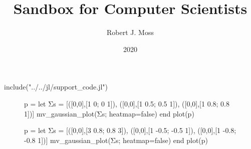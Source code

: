 \documentclass[fullbook]{tufte_algorithms_book}
\title{Sandbox for Computer Scientists}
\author[Moss]{Robert J. Moss}
\date{2020}
\begin{document}
\begin{jlcode}
	include("../../jl/support_code.jl")
\end{jlcode}

% 

\begin{figure}
    \begin{jlcode}
    p = let
        Σs = [([0,0],[1 0; 0 1]),
              ([0,0],[1 0.5; 0.5 1]),
              ([0,0],[1 0.8; 0.8 1])]
        mv_gaussian_plot(Σs; heatmap=false)
    end
    plot(p)
    \end{jlcode}
    \begin{center}
    \end{center}
\end{figure}

\begin{figure}
    \begin{jlcode}
    p = let
        Σs = [([0,0],[3 0.8; 0.8 3]),
              ([0,0],[1 -0.5; -0.5 1]),
              ([0,0],[1 -0.8; -0.8 1])]
        mv_gaussian_plot(Σs; heatmap=false)
    end
    plot(p)
    \end{jlcode}
    \begin{center}
    \end{center}
\end{figure}
\end{document}
